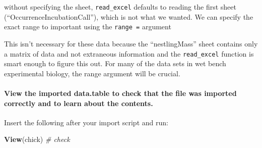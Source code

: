 \documentclass[]{book}
\newenvironment{Shaded}{\begin{snugshade}}{\end{snugshade}}
\newcommand{\CommentTok}[1]{\textcolor[rgb]{0.56,0.35,0.01}{\textit{#1}}}
\newcommand{\DataTypeTok}[1]{\textcolor[rgb]{0.13,0.29,0.53}{#1}}
\newcommand{\KeywordTok}[1]{\textcolor[rgb]{0.13,0.29,0.53}{\textbf{#1}}}
\newcommand{\NormalTok}[1]{#1}
\newcommand{\OperatorTok}[1]{\textcolor[rgb]{0.81,0.36,0.00}{\textbf{#1}}}
\newcommand{\StringTok}[1]{\textcolor[rgb]{0.31,0.60,0.02}{#1}}
\let\oldparagraph\paragraph
\renewcommand{\paragraph}[1]{\oldparagraph{#1}\mbox{}}
\begin{document}
\begin{Shaded}
\end{Shaded}

without specifying the sheet, \texttt{read\_excel} defaults to reading the first sheet (``OccurrenceIncubationCall''), which is not what we wanted. We can specify the exact range to important using the \texttt{range\ =} argument

\begin{Shaded}
\end{Shaded}

This isn't necessary for these data because the ``nestlingMass'' sheet contains only a matrix of data and not extraneous information and the \texttt{read\_excel} function is smart enough to figure this out. For many of the data sets in wet bench experimental biology, the range argument will be crucial.

\hypertarget{view-the-imported-data.table-to-check-that-the-file-was-imported-correctly-and-to-learn-about-the-contents.}{%
\paragraph{View the imported data.table to check that the file was imported correctly and to learn about the contents.}\label{view-the-imported-data.table-to-check-that-the-file-was-imported-correctly-and-to-learn-about-the-contents.}}

Insert the following after your import script and run:

\begin{Shaded}
\begin{Highlighting}[]
\KeywordTok{View}\NormalTok{(chick) }\CommentTok{# check}
\end{Highlighting}
\end{Shaded}
\end{document}
